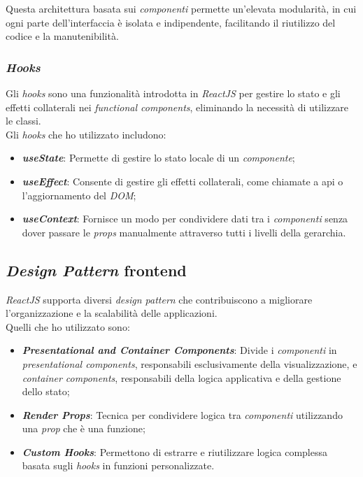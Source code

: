 \noindent Questa architettura basata sui \textit{componenti} permette un'elevata modularità, in cui ogni parte dell'interfaccia è isolata e indipendente, facilitando il riutilizzo del codice e la manutenibilità.

\subsubsection{\textit{Hooks}}

Gli \textit{hooks} sono una funzionalità introdotta in \textit{ReactJS} per gestire lo stato e gli effetti collaterali nei \textit{functional components}, eliminando la necessità di utilizzare le classi.\\

\noindent Gli \textit{hooks} che ho utilizzato includono:
\begin{itemize}
    \item \textbf{\textit{useState}}: Permette di gestire lo stato locale di un \textit{componente};
    \item \textbf{\textit{useEffect}}: Consente di gestire gli effetti collaterali, come chiamate a \gls{api} o l'aggiornamento del \textit{DOM};
    \item \textbf{\textit{useContext}}: Fornisce un modo per condividere dati tra i \textit{componenti} senza dover passare le \textit{props} manualmente attraverso tutti i livelli della gerarchia.
\end{itemize}

\subsection*{\textit{Design Pattern} \gls{frontend}}

\textit{ReactJS} supporta diversi \textit{design pattern} che contribuiscono a migliorare l'organizzazione e la scalabilità delle applicazioni. \\
Quelli che ho utilizzato sono:
\begin{itemize}
    \item \textbf{\textit{Presentational and Container Components}}: Divide i \textit{componenti} in \textit{presentational components}, responsabili esclusivamente della visualizzazione, e \textit{container components}, responsabili della logica applicativa e della gestione dello stato;
    \item \textbf{\textit{Render Props}}: Tecnica per condividere logica tra \textit{componenti} utilizzando una \textit{prop} che è una funzione;
    \item \textbf{\textit{Custom Hooks}}: Permettono di estrarre e riutilizzare logica complessa basata sugli \textit{hooks} in funzioni personalizzate.
\end{itemize}


